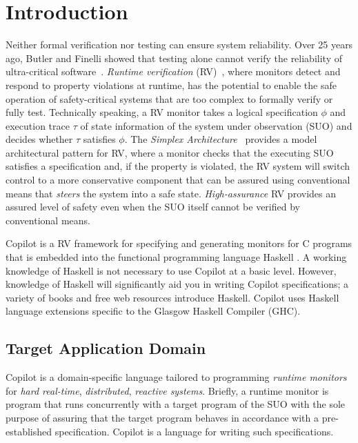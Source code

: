 
\section{Introduction} \label{sec:introduction}


Neither formal verification nor testing can ensure system reliability.
%
Over 25 years ago, Butler and Finelli showed that testing alone cannot verify
the reliability of ultra-critical software~\cite{butler}.
%
\emph{Runtime verification} (RV)~\cite{monitors}, where monitors detect and
respond to property violations at runtime, has the potential to enable the safe
operation of safety-critical systems that are too complex to formally verify or
fully test.
%
Technically speaking, a RV monitor takes a logical specification $\phi$ and
execution trace $\tau$ of state information of the system under observation
(SUO) and decides whether $\tau$ satisfies $\phi$.
%
The \emph{Simplex Architecture}~\cite{simplex} provides a model architectural
pattern for RV, where a monitor checks that the executing SUO satisfies a
specification and, if the property is violated, the RV system will switch
control to a more conservative component that can be assured using conventional
means that \emph{steers} the system into a safe state.
%
\emph{High-assurance} RV provides an assured level of safety even when the SUO
itself cannot be verified by conventional means.

Copilot is a RV framework for specifying and generating monitors for C programs
that is embedded into the functional programming language Haskell
\cite{PeytonJones02}.
%
 A working knowledge of Haskell is not necessary to use Copilot at a basic
level.
%
 However, knowledge of Haskell will significantly aid you in writing Copilot
specifications;  a variety of books and free web resources introduce Haskell.
%
  Copilot uses Haskell language extensions specific to the Glasgow Haskell
Compiler (GHC).

\subsection{Target Application Domain} \label{domain}


Copilot is a domain-specific language tailored to programming \emph{runtime
monitors} for \emph{hard real-time}, \emph{distributed}, \emph{reactive
systems}.
%
Briefly, a runtime monitor is program that runs concurrently with a target
program of the SUO with the sole purpose of assuring that the target program
behaves in accordance with a pre-established specification.
%
 Copilot is a language for writing such specifications.
%

